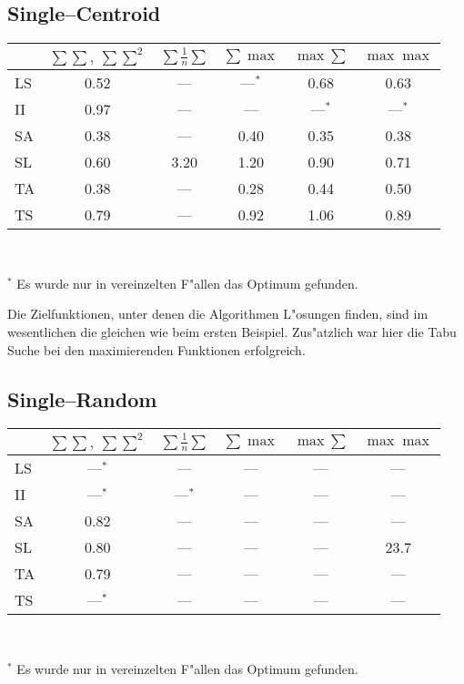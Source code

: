 \subsection*{Single--Centroid}
\begin{center}
\begin{tabular}{l|c|c|c|c|c}
 & $\sum\sum,\ \sum\sum^2$ & $\sum \frac 1n \sum$ & $\sum\max$ & $ \max\sum$ &
 	$\max\max$\\
	\hline
LS & 0.52 & ---  & ---$^*$ & 0.68    & 0.63 \\
II & 0.97 & ---  & ---     & ---$^*$ & ---$^*$ \\
SA & 0.38 & ---  & 0.40    & 0.35    & 0.38 \\
SL & 0.60 & 3.20 & 1.20    & 0.90    & 0.71 \\
TA & 0.38 & ---  & 0.28    & 0.44    & 0.50 \\
TS & 0.79 & ---  & 0.92    & 1.06    & 0.89 
\end{tabular}\\
\end{center}
$^*$ Es wurde nur in vereinzelten F"allen das Optimum gefunden.

Die Zielfunktionen, unter denen die Algorithmen L"osungen finden, sind
im wesentlichen die gleichen wie beim ersten Beispiel.
Zus"atzlich war hier die Tabu Suche bei den maximierenden Funktionen
erfolgreich.

\subsection*{Single--Random}
\begin{center}
\begin{tabular}{l|c|c|c|c|c}
 & $\sum\sum,\ \sum\sum^2$ & $\sum \frac 1n \sum$ & $\sum\max$ & $ \max\sum$ &
 	$\max\max$\\
	\hline
LS & ---$^*$ & ---     & --- & --- & --- \\
II & ---$^*$ & ---$^*$ & --- & --- & --- \\
SA & 0.82    & ---     & --- & --- & --- \\
SL & 0.80    & ---     & --- & --- & 23.7\\
TA & 0.79    & ---     & --- & --- & --- \\
TS & ---$^*$ & ---     & --- & --- & --- 
\end{tabular}\\
\end{center}
$^*$ Es wurde nur in vereinzelten F"allen das Optimum gefunden.

